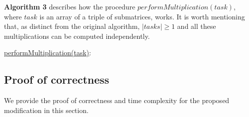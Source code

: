 \documentclass[runningheads]{llncs}
\begin{document}
\textbf{Algorithm 3} describes how the procedure $performMultiplication(task)$, where $task$ is an array of a triple of submatrices, works. It is worth mentioning that, as distinct from the original algorithm, $|tasks| \ge 1$ and all these multiplications can be computed independently.


\begin{algorithm}[h!]
\SetAlgoNoLine
\underline{performMultiplication(task)}{:}{\\
}
\caption{}
\end{algorithm}

\subsection{Proof of correctness}

We provide the proof of correctness and time complexity for the proposed modification in this section. 
\end{document}
